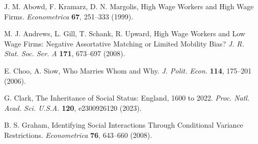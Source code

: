 \documentclass[9pt,twocolumn,twoside]{pnas-new}
\begin{document}
\showmatmethods{}


\showacknow{}

\begin{thebibliography}{9}

J. M. Abowd, F. Kramarz, D. N. Margolis, 
High Wage Workers and High Wage Firms. 
\textit{Econometrica} \textbf{67}, 251--333 (1999).

M. J. Andrews, L. Gill, T. Schank, R. Upward, 
High Wage Workers and Low Wage Firms: Negative Assortative Matching or Limited Mobility Bias? 
\textit{J. R. Stat. Soc. Ser. A} \textbf{171}, 673--697 (2008).

E. Choo, A. Siow, 
Who Marries Whom and Why. 
\textit{J. Polit. Econ.} \textbf{114}, 175--201 (2006).

G. Clark, 
The Inheritance of Social Status: England, 1600 to 2022. 
\textit{Proc. Natl. Acad. Sci. U.S.A.} \textbf{120}, e2300926120 (2023).

B. S. Graham, 
Identifying Social Interactions Through Conditional Variance Restrictions. 
\textit{Econometrica} \textbf{76}, 643--660 (2008).

\end{thebibliography}
\end{document}
